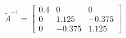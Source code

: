 \[
\tilde A^{-1}=\left[
\begin{array}{ccc}
  0.4 & 0 & 0 \\
  0 & 1.125 & -0.375 \\
  0 & -0.375 & 1.125
\end{array}\right]
\]
